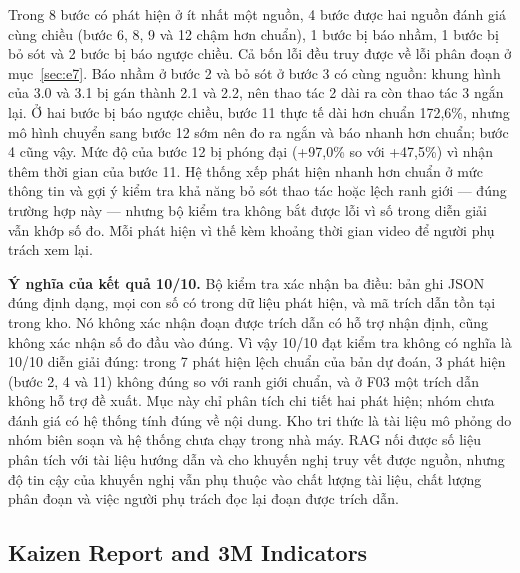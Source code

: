 Trong 8 bước có phát hiện ở ít nhất một nguồn, 4 bước được hai nguồn đánh giá cùng chiều (bước 6, 8, 9 và 12 chậm hơn chuẩn), 1 bước bị báo nhầm, 1 bước bị bỏ sót và 2 bước bị báo ngược chiều. Cả bốn lỗi đều truy được về lỗi phân đoạn ở mục~\ref{sec:e7}. Báo nhầm ở bước 2 và bỏ sót ở bước 3 có cùng nguồn: khung hình của 3.0 và 3.1 bị gán thành 2.1 và 2.2, nên thao tác 2 dài ra còn thao tác 3 ngắn lại. Ở hai bước bị báo ngược chiều, bước 11 thực tế dài hơn chuẩn 172,6\%, nhưng mô hình chuyển sang bước 12 sớm nên đo ra ngắn và báo nhanh hơn chuẩn; bước 4 cũng vậy. Mức độ của bước 12 bị phóng đại (+97,0\% so với +47,5\%) vì nhận thêm thời gian của bước 11. Hệ thống xếp phát hiện nhanh hơn chuẩn ở mức thông tin và gợi ý kiểm tra khả năng bỏ sót thao tác hoặc lệch ranh giới — đúng trường hợp này — nhưng bộ kiểm tra không bắt được lỗi vì số trong diễn giải vẫn khớp số đo. Mỗi phát hiện vì thế kèm khoảng thời gian video để người phụ trách xem lại.

\textbf{Ý nghĩa của kết quả 10/10.} Bộ kiểm tra xác nhận ba điều: bản ghi JSON đúng định dạng, mọi con số có trong dữ liệu phát hiện, và mã trích dẫn tồn tại trong kho. Nó không xác nhận đoạn được trích dẫn có hỗ trợ nhận định, cũng không xác nhận số đo đầu vào đúng. Vì vậy 10/10 đạt kiểm tra không có nghĩa là 10/10 diễn giải đúng: trong 7 phát hiện lệch chuẩn của bản dự đoán, 3 phát hiện (bước 2, 4 và 11) không đúng so với ranh giới chuẩn, và ở F03 một trích dẫn không hỗ trợ đề xuất. Mục này chỉ phân tích chi tiết hai phát hiện; nhóm chưa đánh giá có hệ thống tính đúng về nội dung. Kho tri thức là tài liệu mô phỏng do nhóm biên soạn và hệ thống chưa chạy trong nhà máy. RAG nối được số liệu phân tích với tài liệu hướng dẫn và cho khuyến nghị truy vết được nguồn, nhưng độ tin cậy của khuyến nghị vẫn phụ thuộc vào chất lượng tài liệu, chất lượng phân đoạn và việc người phụ trách đọc lại đoạn được trích dẫn.

\subsection{Kaizen Report and 3M Indicators}\label{sec:e9}

